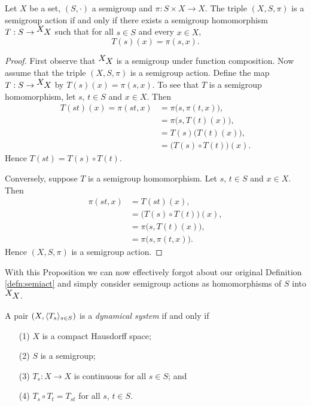   \begin{prop} 
    \label{prop:semiact}
    Let $X$ be a set, $(S,\cdot)$ a semigroup and $\pi : S \times X \to X$.
    The triple $(X, S, \pi)$ is a semigroup action if and only if
    there exists a semigroup homomorphism $T : S \to \hbox{${}^{\hbox{$X$}}\hskip -1 pt X$}$ such
    that for all $s \in S$ and every $x \in X$,
      \[ T(s)(x) = \pi(s,x). \]
  \end{prop}
  \begin{proof}
    First observe that $\hbox{${}^{\hbox{$X$}}\hskip -1 pt X$}$ is a semigroup under function composition.
    Now assume that the triple $(X, S, \pi)$ is a semigroup action. 
    Define the map $T : S \to \hbox{${}^{\hbox{$X$}}\hskip -1 pt X$}$ by $T(s)(x) =
    \pi(s,x)$.
    To see that $T$ is a semigroup homomorphism, let $s$, $t \in S$
    and $x \in X$. 
    Then 
      \begin{align*}
        T(st)(x) = \pi(st,x) &= \pi\bigl(s, \pi(t,x)\bigr), \\
        &= \pi\bigl(s, T(t)(x)\bigr), \\
        &= T(s)\bigl(T(t)(x)\bigr), \\
        &= \bigl(T(s) \circ T(t)\bigr) (x).
      \end{align*}
    Hence $T(st) = T(s) \circ T(t)$.

    Conversely, suppose $T$ is a semigroup homomorphism. 
    Let $s$, $t \in S$ and $x \in X$.
    Then 
      \begin{align*}
        \pi(st, x) &= T(st)(x), \\
        &= \bigl(T(s) \circ T(t)\bigr) (x), \\
        &= \pi\bigl(s, T(t)(x)\bigr), \\
        &= \pi\bigl(s, \pi(t,x)\bigr).
      \end{align*}
    Hence $(X, S, \pi)$ is a semigroup action.
  \end{proof}

With this Proposition we can now effectively forgot about our original Definition \ref{defn:semiact} and simply consider semigroup actions as homomorphisms of $S$ into $\hbox{${}^{\hbox{$X$}}\hskip -1 pt X$}$. 


  \begin{defn}
    A pair $(X, \langle T_s \rangle_{s \in S})$ is a \textsl{dynamical system} if and only if
      \begin{itemize}
        \item[(1)] $X$ is a compact Hausdorff space;
        \item[(2)] $S$ is a semigroup;
        \item[(3)] $T_s : X \to X$ is continuous for all $s \in S$;
          and
        \item[(4)] $T_s \circ T_t = T_{st}$ for all $s$, $t \in S$.
      \end{itemize}
  \end{defn}

